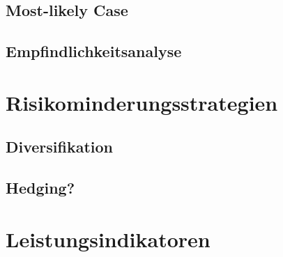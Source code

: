         \subsection{Most-likely Case}

        \subsection{Empfindlichkeitsanalyse}

    \section{Risikominderungsstrategien}

        \subsection{Diversifikation}

        \subsection{Hedging?}

    \section{Leistungsindikatoren}
